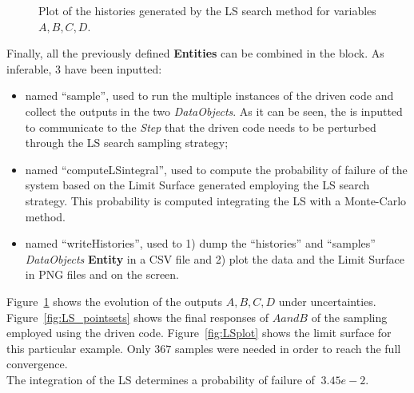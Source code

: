 \begin{enumerate}
\begin{figure}[h!]
  \caption{Plot of the histories generated by the LS search method for variables $A,B,C,D$.}
  \label{fig:LS_histories}
 \end{figure}
   Finally, all the previously defined \textbf{Entities} can be combined in 
   the  block. As inferable, 
   3  have been inputted:
   \begin{itemize}
     \item {} named ``sample'', used to run the multiple  
     instances of the driven code and 
     collect the outputs in the two \textit{DataObjects}. As it can be
     seen, the  is inputted to communicate to the 
     \textit{Step} that the driven code needs to
     be perturbed through the LS search sampling strategy;
     \item {} named ``computeLSintegral'', used to 
     compute the probability of failure of the system based on the Limit
     Surface generated employing the LS search strategy. This 
     probability is computed integrating the LS with a Monte-Carlo 
     method. 
     \item  {} named ``writeHistories'', used to 1) dump 
     the ``histories'' and ``samples''  \textit{DataObjects} 
     \textbf{Entity} in a CSV file and 2) plot the data and the Limit Surface 
     in  PNG files and on the screen.
   \end{itemize}
\end{enumerate} 
 Figure~\ref{fig:LS_histories} 
 shows the evolution of the outputs $A,B,C,D$ under uncertainties. 
 Figure~\ref{fig:LS_pointsets} shows the final responses  of $A and B$
 of the sampling employed using the driven code. 
 Figure~\ref{fig:LSplot}  shows the limit surface for this particular 
 example. Only $367$ samples were needed in order to reach the full 
 convergence.
 \\The integration of the LS determines a probability of failure of 
 $~3.45e-2$.
